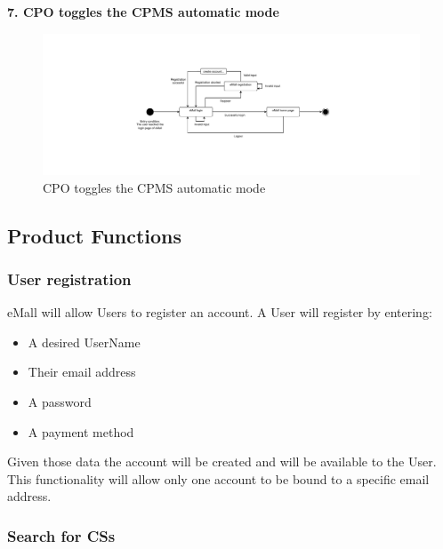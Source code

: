 \documentclass[11pt]{article}
\begin{document}
\begin{description}
    \item \textbf{7. CPO toggles the CPMS automatic mode}
    \begin{figure}[!ht]
        \includegraphics[page={7}, width=\linewidth, trim=10cm 5cm 10cm 5cm, clip]{StateCharts.pdf}
        \caption{CPO toggles the CPMS automatic mode}
    \end{figure}
\end{description}

\subsection{Product Functions}
\label{subsec:prodfunctions}

\subsubsection{User registration}

eMall will allow Users to register an account. A User will register by entering:
\begin{itemize}
    \item A desired UserName
    \item Their email address
    \item A password
    \item A payment method
\end{itemize}
Given those data the account will be created and will be available to the User. This functionality will allow only one account to be bound to a specific email address.

\subsubsection{Search for CSs}
\label{subsubsection:searchForCS}
\end{document}

